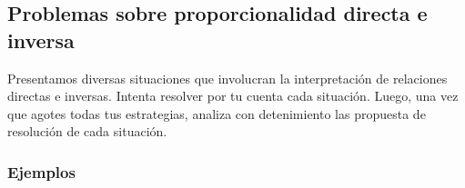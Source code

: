 \documentclass[11pt]{book}
\begin{document}
\subsection{Problemas sobre proporcionalidad directa e inversa}

Presentamos diversas situaciones que involucran la interpretación de relaciones directas e inversas.
Intenta resolver por tu cuenta cada situación. Luego, una vez que agotes todas tus estrategias, analiza con detenimiento las propuesta de resolución de cada situación.

\subsubsection{Ejemplos}




\newpage
\end{document}
